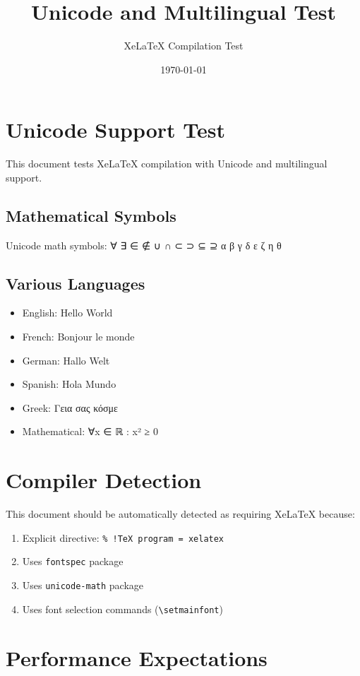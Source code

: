 \documentclass{article}
\title{Unicode and Multilingual Test}
\author{XeLaTeX Compilation Test}
\date{\today}
\begin{document}
  

\maketitle

\section{Unicode Support Test}

This document tests XeLaTeX compilation with Unicode and multilingual support.

\subsection{Mathematical Symbols}
Unicode math symbols: ∀ ∃ ∈ ∉ ∪ ∩ ⊂ ⊃ ⊆ ⊇ α β γ δ ε ζ η θ

\subsection{Various Languages}
\begin{itemize}
    \item English: Hello World
    \item French: Bonjour le monde  
    \item German: Hallo Welt
    \item Spanish: Hola Mundo
    \item Greek: Γεια σας κόσμε
    \item Mathematical: ∀x ∈ ℝ : x² ≥ 0
\end{itemize}

\section{Compiler Detection}

This document should be automatically detected as requiring XeLaTeX because:
\begin{enumerate}
    \item Explicit directive: \texttt{\% !TeX program = xelatex}
    \item Uses \texttt{fontspec} package
    \item Uses \texttt{unicode-math} package  
    \item Uses font selection commands (\texttt{\textbackslash setmainfont})
\end{enumerate}

\section{Performance Expectations}
\end{document}
